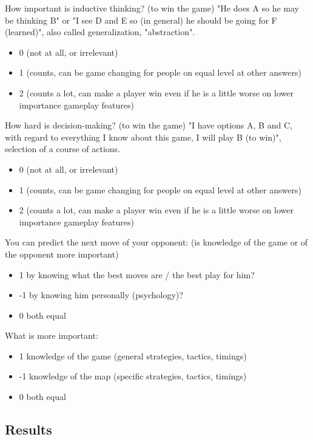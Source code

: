 How important is inductive thinking? (to win the game)
"He does A so he may be thinking B" or "I see D and E so (in general) he should be going for F (learned)", also called generalization, "abstraction".
\begin{itemize}
    \item 0 (not at all, or irrelevant)
    \item 1 (counts, can be game changing for people on equal level at other answers)
    \item 2 (counts a lot, can make a player win even if he is a little worse on lower importance gameplay features)
\end{itemize}


How hard is decision-making? (to win the game)
"I have options A, B and C, with regard to everything I know about this game, I will play B (to win)", selection of a course of actions.
\begin{itemize}
    \item 0 (not at all, or irrelevant)
    \item 1 (counts, can be game changing for people on equal level at other answers)
    \item 2 (counts a lot, can make a player win even if he is a little worse on lower importance gameplay features)
\end{itemize}


You can predict the next move of your opponent:
(is knowledge of the game or of the opponent more important)
\begin{itemize}
    \item 1 by knowing what the best moves are / the best play for him?
    \item -1 by knowing him personally (psychology)?
    \item 0 both equal
\end{itemize}


What is more important:
\begin{itemize}
    \item 1 knowledge of the game (general strategies, tactics, timings)
    \item -1 knowledge of the map (specific strategies, tactics, timings)
    \item 0 both equal
\end{itemize}

\subsection{Results}

